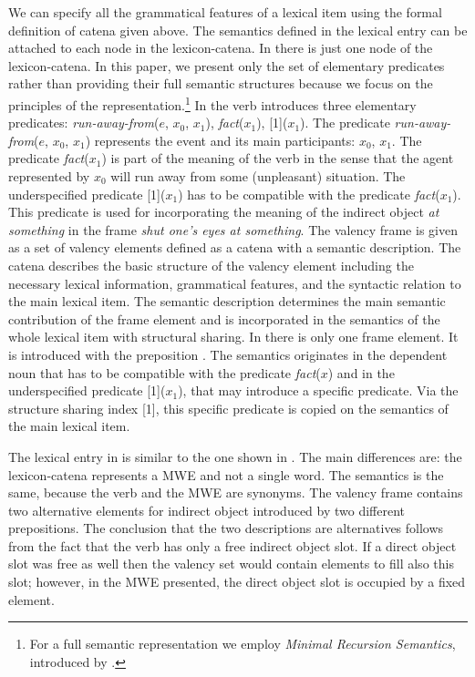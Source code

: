 \documentclass[output=paper]{langsci/langscibook}
\begin{document}
We can specify all the grammatical features of a lexical item using the formal definition of catena given above. The semantics defined in the lexical entry can be attached to each node in the lexicon-catena. In  there is just one node of the lexicon-catena. 
In this paper, we present only the set of elementary predicates rather than providing their full semantic structures because we focus on the principles of the representation.\footnote{For a full semantic representation we employ \textit{Minimal Recursion Semantics}, introduced by \cite{copestake2005mrs}.} 
In  the verb introduces three elementary predicates: {\em run-away-from}($e$, $x_0$, $x_1$), {\em fact}($x_1$), [1]($x_1$). The predicate {\em run-away-from}($e$, $x_0$, $x_1$) represents the event and its main participants: $x_0$, $x_1$. The predicate {\em fact}($x_1$) is part of the meaning of the verb in the sense that the agent represented by $x_0$ will run away from some (unpleasant) situation. The underspecified predicate [1]($x_1$) has to be compatible with the predicate {\em fact}($x_1$). 
This predicate is used for incorporating the meaning of the indirect object \textit{at something} in the frame \textit{shut one's eyes at something}. 
The valency frame is given as a set of valency elements defined as a catena with a semantic description. The catena describes the basic structure of the valency element including the necessary lexical information, grammatical features, and the syntactic relation to the main lexical item. The semantic description determines the main semantic contribution of the frame element and is incorporated in the semantics of the whole lexical item with structural sharing. 
In  there is only one frame element. It is introduced with the preposition . The semantics originates in the dependent noun that has to be compatible with the predicate {\em fact}($x$) and in the underspecified predicate [1]($x_1$), that may introduce a specific predicate. Via the structure sharing index [1], this specific predicate is copied on the semantics of the main lexical item.


The lexical entry in  is similar to the one shown in . The main differences are: the lexicon-catena represents a MWE and not a single word. The semantics is the same, because the verb and the MWE are synonyms. The valency frame contains two alternative elements for indirect object introduced by two different prepositions. The conclusion that the two descriptions are alternatives follows from the fact that the verb has only a free indirect object slot. If a direct object slot was free as well then the valency set would contain elements to fill also this slot; however, in the MWE presented, the direct object slot is occupied by a fixed element.
\end{document}
